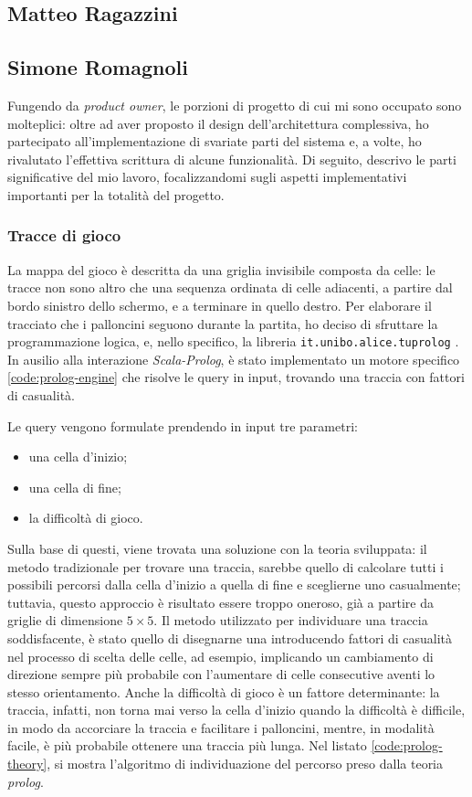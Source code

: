 \subsection{Matteo Ragazzini}

\subsection{Simone Romagnoli}
Fungendo da \textit{product owner}, le porzioni di progetto di cui mi sono occupato sono molteplici: oltre ad aver 
proposto il design dell'architettura complessiva, ho partecipato all'implementazione di svariate parti del sistema e, a 
volte, ho rivalutato l'effettiva scrittura di alcune funzionalità. Di seguito, descrivo le parti significative del mio 
lavoro, focalizzandomi sugli aspetti implementativi importanti per la totalità del progetto.

\subsubsection{Tracce di gioco}
La mappa del gioco è descritta da una griglia invisibile composta da celle: le tracce non sono altro
che una sequenza ordinata di celle adiacenti, a partire dal bordo sinistro dello schermo, e a terminare in quello
destro. Per elaborare il tracciato che i palloncini seguono durante la partita, ho deciso di sfruttare la programmazione
logica, e, nello specifico, la libreria \texttt{it.unibo.alice.tuprolog} \cite{TuProlog}. In ausilio alla interazione
\textit{Scala-Prolog}, è stato implementato un motore specifico \ref{code:prolog-engine} che risolve le query in input,
trovando una traccia con fattori di casualità.



Le query vengono formulate prendendo in input tre parametri:
\begin{itemize}
    \item una cella d'inizio;
    \item una cella di fine;
    \item la difficoltà di gioco.
\end{itemize}

Sulla base di questi, viene trovata una soluzione con la teoria sviluppata: il metodo tradizionale per trovare una
traccia, sarebbe quello di calcolare tutti i possibili percorsi dalla cella d'inizio a quella di fine e sceglierne uno
casualmente; tuttavia, questo approccio è risultato essere troppo oneroso, già a partire da griglie di dimensione
$5 \times 5$. Il metodo utilizzato per individuare una traccia soddisfacente, è stato quello di disegnarne una
introducendo fattori di casualità nel processo di scelta delle celle, ad esempio, implicando un cambiamento di direzione
sempre più probabile con l'aumentare di celle consecutive aventi lo stesso orientamento. Anche la difficoltà di gioco
è un fattore determinante: la traccia, infatti, non torna mai verso la cella d'inizio quando la difficoltà è difficile,
in modo da accorciare la traccia e facilitare i palloncini, mentre, in modalità facile, è più probabile ottenere una
traccia più lunga. Nel listato \ref{code:prolog-theory}, si mostra l'algoritmo di individuazione del percorso preso
dalla teoria \textit{prolog}.


